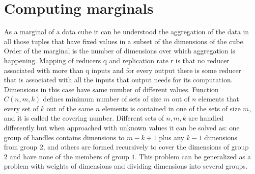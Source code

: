 \section{Computing marginals} \label{marginals}
As a marginal of a data cube it can be understood the aggregation of the data in all those tuples that have fixed values in a subset of the dimensions of the cube. Order of the marginal is the number of dimensions over which aggregation is happening. Mapping of reducers q and replication rate r is that no reducer associated with more than q inputs and for every output there is some reducer that is associated with all the inputs that output needs for its computation. Dimensions in this case have same number of different values.
Function $C(n,m,k)$ defines minimum number of sets of size $m$ out of $n$ elements that every set of $k$ out of the same $n$ elements is contained in one of the sets of size $m$, and it is called the covering number.
Different sets of $n,m,k$ are handled differently but when approached with unknown values it can be solved as: one group of handles contains dimensions to $m-k+1$ plus any $k-1$ dimensions from group $2$, and others are formed recursively to cover the dimensions of group $2$ and have none of the members of group $1$.
This problem can be generalized as a problem with weights of dimensions and dividing dimensions into several groups. \cite{marginals}

